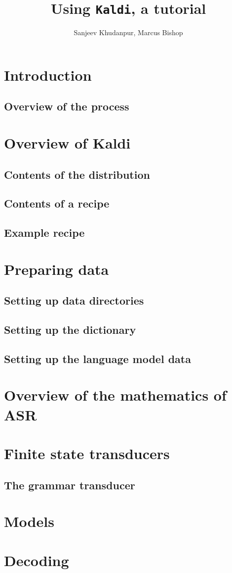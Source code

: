 \documentclass[12pt]{article}
\title{Using \texttt{Kaldi}, a tutorial}
\author{Sanjeev Khudanpur, Marcus Bishop}
\begin{document}
\maketitle

\section{Introduction}

\subsection{Overview of the process}


\section{Overview of \textsf{Kaldi}}

\subsection{Contents of the distribution}

\subsection{Contents of a recipe}

\subsection{Example recipe}


\section{Preparing data}\label{data}

\subsection{Setting up data directories}

\subsection{Setting up the dictionary}\label{dict}

\subsection{Setting up the language model data}


\section{Overview of the mathematics of ASR}


\section{Finite state transducers}\label{fst}

\subsection{The grammar transducer}

\section{Models}\label{model}
\section{Decoding}\label{decode}



\end{document}
